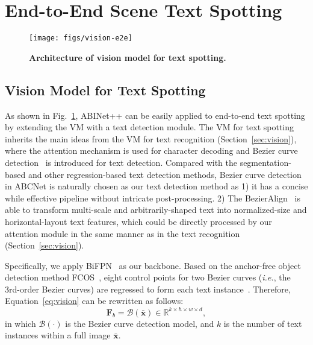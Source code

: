 \documentclass[10pt,journal,compsoc]{IEEEtran}
\def\ie{{\it i.e.}\xspace}
\begin{document}
\section{End-to-End Scene Text Spotting}

\begin{figure}
  \begin{center}
     \texttt{[image: figs/vision-e2e]}
     \caption{\textbf{Architecture of vision model for text spotting.}}
     \label{fig:vision-e2e}
  \end{center}
  \vspace{-1em}    
\end{figure}


\subsection{Vision Model for Text Spotting}

As shown in Fig.~\ref{fig:vision-e2e}, ABINet++ can be easily applied to end-to-end text spotting by extending the VM with a text detection module. The VM for text spotting inherits the main ideas from the VM for text recognition (Section~\ref{sec:vision}), where the attention mechanism is used for character decoding and Bezier curve detection~\cite{liu2020abcnet,liu2020abcnetv2} is introduced for text detection. Compared with the segmentation-based and other regression-based text detection methods, Bezier curve detection in ABCNet is naturally chosen as our text detection method as 1) it has a concise while effective pipeline without intricate post-processing. 2) The BezierAlign~\cite{liu2020abcnet} is able to transform multi-scale and arbitrarily-shaped text into normalized-size and horizontal-layout text features, which could be directly processed by our attention module in the same manner as in the text recognition (Section~\ref{sec:vision}).

Specifically, we apply BiFPN~\cite{tan2020efficientdet, liu2020abcnetv2} as our backbone. Based on the anchor-free object detection method FCOS~\cite{tian2019fcos}, eight control points for two Bezier curves (\ie, the 3rd-order Bezier curves) are regressed to form each text instance~\cite{liu2020abcnet}. Therefore, Equation~\ref{eq:vision} can be rewritten as follows:
\begin{equation}
\mathbf{F}_b = \mathcal{B}(\bm{\bar{x}}) \in \mathbb{R}^{k \times h \times w \times d}, 
\end{equation}
in which $\mathcal{B}(\cdot)$ is the Bezier curve detection model, and $k$ is the number of text instances within a full image $\bm{\bar{x}}$.
\end{document}
